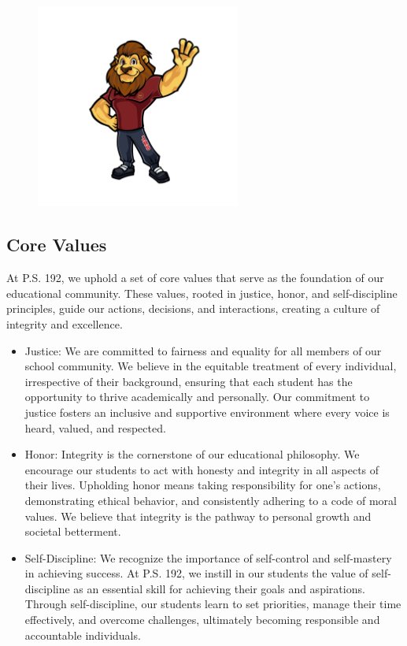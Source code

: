 \documentclass[letterpaper, 11pt]{article}
\begin{document}
\begin{figure}
\centering
\includegraphics[width=0.6\textwidth]{logohim.jpg}
\end{figure}

\subsection{Core Values}
\label{sec:org0c4ccaf}
At P.S. 192, we uphold a set of core values that serve as the foundation of our educational community. These values, rooted in justice, honor, and self-discipline principles, guide our actions, decisions, and interactions, creating a culture of integrity and excellence.

\begin{itemize}
\item Justice: We are committed to fairness and equality for all members of our school community. We believe in the equitable treatment of every individual, irrespective of their background, ensuring that each student has the opportunity to thrive academically and personally. Our commitment to justice fosters an inclusive and supportive environment where every voice is heard, valued, and respected.
\item Honor: Integrity is the cornerstone of our educational philosophy. We encourage our students to act with honesty and integrity in all aspects of their lives. Upholding honor means taking responsibility for one's actions, demonstrating ethical behavior, and consistently adhering to a code of moral values. We believe that integrity is the pathway to personal growth and societal betterment.
\item Self-Discipline: We recognize the importance of self-control and self-mastery in achieving success. At P.S. 192, we instill in our students the value of self-discipline as an essential skill for achieving their goals and aspirations. Through self-discipline, our students learn to set priorities, manage their time effectively, and overcome challenges, ultimately becoming responsible and accountable individuals.
\end{itemize}
\end{document}
